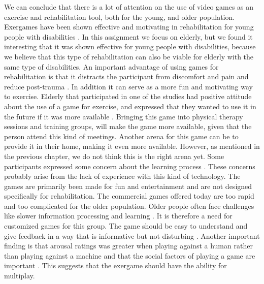 We can conclude that there is a lot of attention on the use of video games as an exercise and rehabilitation tool, both for the young, and older population. Exergames have been shown effective and motivating in rehabilitation for young people with disabilities \cite{kinect}. In this assignment we focus on elderly, but we found it interesting that it was shown effective for young people with disabilities, because we believe that  this type of rehabilitation can also be viable for elderly with the same type of disabilities. An important advantage of using games for rehabilitation is that it distracts the participant from discomfort and pain and reduce post-trauma  \cite{roleofvideogames}. In addition it can serve as a more fun and motivating way to exercise. Elderly that participated in one of the studies had positive attitude about the use of a game for exercise, and expressed that they wanted to use it in the future if it was more available \cite{excell}. Bringing this game into physical therapy sessions and training groups, will make the game more available, given that the  person attend this kind of meetings. Another arena for this game can be to provide it in their home, making it even more available. However, as mentioned in the previous chapter, we do not think this is the right arena yet.  Some participants  expressed some concern about the learning process \cite{taylor2011activity}. These concerns probably arise from the lack of experience with this kind of technology.  The games are primarily been made for fun and entertainment and are not designed specifically for rehabilitation.  The commercial games offered today are too rapid and too complicated for the older population. Older people often face challenges like slower information processing and learning \cite{exergamesforelderly}. It is therefore a need for customized games for this group. The game should be easy to understand and give feedback in a way that is informative but not disturbing \cite{exergamesforelderly}. Another important finding is that arousal ratings was greater when playing against a human rather than playing against a machine and that the social factors of playing a game are important \cite{exergamesforelderly} \cite{taylor2011activity}. This suggests that the exergame should have the ability for multiplay.  \\ \\

